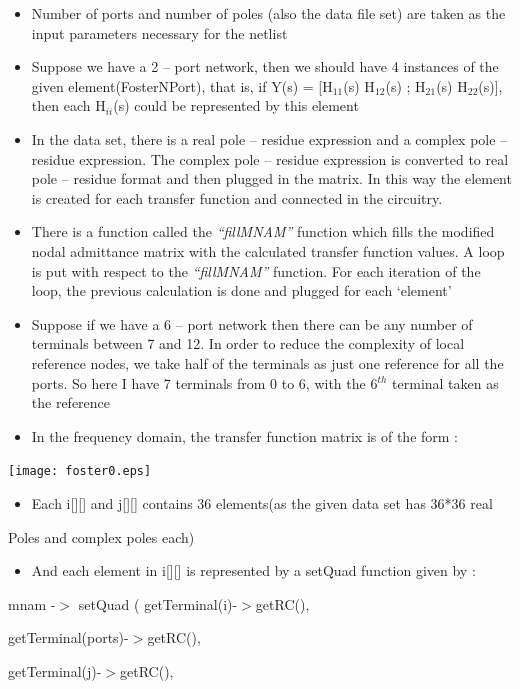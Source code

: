 \documentclass{article}
\begin{document}
\begin{itemize}
\item Number of ports and number of poles (also the data file set) are taken as the input parameters necessary for the netlist
\item Suppose we have a 2 -- port network, then we should have 4 instances of the given element(FosterNPort), that is, if Y(s) = [H$_{11}$(s) H$_{12}$(s) ; H$_{21}$(s) H$_{22}$(s)], then each H$_{ii}$(s) could be represented by this element
\item In the data set, there is a real pole -- residue expression and a complex pole -- residue expression. The complex pole -- residue expression is converted to real pole -- residue format and then plugged in the matrix. In this way the element is created for each transfer function and connected in the circuitry.
\item There is a function called the \textit{``fillMNAM''} function which fills the modified nodal admittance matrix with the calculated transfer function values. A loop is put with respect to the \textit{``fillMNAM''} function. For each iteration of the loop, the previous calculation is done and plugged for each `element'
\item Suppose if we have a 6 -- port network then there can be any number of terminals between 7 and 12. In order to reduce the complexity of local reference nodes, we take half of the terminals as just one reference for all the ports. So here I have 7 terminals from 0 to 6, with the 6$^{th}$ terminal taken as the reference
\item In the frequency domain, the transfer function matrix is of the form :
\end{itemize}


\centerline{\texttt{[image: foster0.eps]}}

\begin{itemize}
\item Each i[][] and j[][] contains 36 elements(as the given data set has 36*36 real
\end{itemize}
Poles and complex poles each)

\begin{itemize}
\item And each element in i[][] is represented by a setQuad function given by :
\end{itemize}
mnam -$>$ setQuad ( getTerminal(i)-$>$getRC(),

getTerminal(ports)-$>$getRC(),

getTerminal(j)-$>$getRC(),
\end{document}
